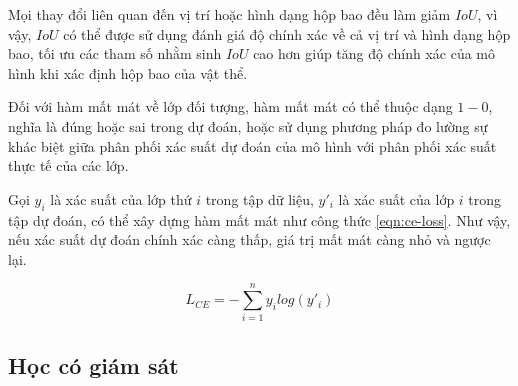 Mọi thay đổi liên quan đến vị trí hoặc hình dạng hộp bao đều làm giảm $IoU$, vì vậy, $IoU$ có thể được sử dụng đánh giá độ chính xác về cả vị trí và hình dạng hộp bao, tối ưu các tham số nhằm sinh $IoU$ cao hơn giúp tăng độ chính xác của mô hình khi xác định hộp bao của vật thể.

Đối với hàm mất mát về lớp đối tượng, hàm mất mát có thể thuộc dạng $1 - 0$, nghĩa là đúng hoặc sai trong dự đoán, hoặc sử dụng phương pháp đo lường sự khác biệt giữa phân phối xác suất dự đoán của mô hình với phân phối xác suất thực tế của các lớp.

Gọi $y_i$ là xác suất của lớp thứ $i$ trong tập dữ liệu, $y'_i$ là xác suất của lớp $i$ trong tập dự đoán, có thể xây dựng hàm mất mát như công thức \ref{eqn:ce-loss}. Như vậy, nếu xác suất dự đoán chính xác càng thấp, giá trị mất mát càng nhỏ và ngược lại.

\begin{equation}
	\label{eqn:ce-loss}
	L_{CE} = - \sum_{i = 1}^{n}y_ilog(y'_i)
\end{equation}


\subsection{Học có giám sát}




